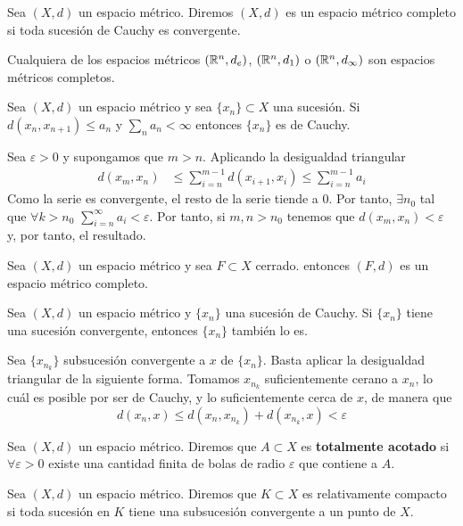\documentclass[FyPI.tex]{subfiles}
\begin{document}
\begin{defi}
Sea $(X,d)$ un espacio métrico. Diremos $(X,d)$ es un espacio métrico completo si toda sucesión de Cauchy es convergente.
\end{defi}
\begin{theorem}
Cualquiera de los espacios métricos $(\mathbb{R}^n,d_e)$, $(\mathbb{R}^n,d_1)$ o $(\mathbb{R}^n,d_\infty)$  son espacios métricos completos.
\end{theorem}
\begin{lema}
Sea $(X,d)$ un espacio métrico y sea $\{x_n\} \subset X$ una sucesión. Si $d(x_n,x_{n+1})\leq a_n$ y $\sum_n a_n < \infty$ entonces $\{x_n\}$ es de Cauchy.
\end{lema}
\begin{dem}
Sea $\varepsilon >0$ y supongamos que $m>n$. Aplicando la desigualdad triangular
\begin{align*}
d(x_m,x_n) &\leq \sum_{i=n}^{m-1} d(x_{i+1},x_i)\leq \sum_{i=n}^{m-1} a_i 
\end{align*}
Como la serie es convergente, el resto de la serie tiende a $0$. Por tanto, $\exists n_0$ tal que $\forall k> n_0$ $\sum_{i=n}^\infty a_i < \varepsilon$. Por tanto, si $m,n>n_0$ tenemos que $d(x_m,x_n)<\varepsilon$ y, por tanto, el resultado.
\end{dem}
\begin{ejer}
Sea $(X,d)$ un espacio métrico y sea $F\subset X$ cerrado. entonces $(F,d)$ es un espacio métrico completo.
\end{ejer}
\begin{lema}
Sea $(X,d)$ un espacio métrico y $\{x_n\}$ una sucesión de Cauchy. Si $\{x_n\}$ tiene una sucesión convergente, entonces $\{x_n\}$ también lo es.
\end{lema}
\begin{dem}
Sea $\{x_{n_k}\}$ subsucesión convergente a $x$ de $\{x_n\}$. Basta aplicar la desigualdad triangular de la siguiente forma. Tomamos $x_{n_k}$ suficientemente cerano a $x_n$, lo cuál es posible por ser de Cauchy, y lo suficientemente cerca de $x$, de manera que 
$$
d(x_n,x) \leq d(x_n,x_{n_k}) + d(x_{n_k},x) < \varepsilon
$$
\end{dem}
\begin{defi}
Sea $(X,d)$ un espacio métrico. Diremos que $A\subset X$ es \textbf{totalmente acotado} si $\forall \varepsilon>0$ existe una cantidad finita de bolas de radio $\varepsilon$ que contiene a $A$.
\end{defi}
\begin{defi}
Sea $(X,d)$ un espacio métrico. Diremos que $K\subset X$ es relativamente compacto si toda sucesión en $K$ tiene una subsucesión convergente a un punto de $X$.
\end{defi}
\end{document}
